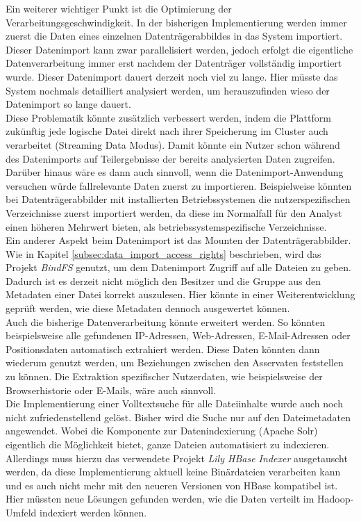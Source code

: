 \noindent
Ein weiterer wichtiger Punkt ist die Optimierung der Verarbeitungsgeschwindigkeit. In der bisherigen Implementierung werden immer zuerst die Daten eines einzelnen Datenträgerabbildes in das System importiert. Dieser Datenimport kann zwar parallelisiert werden, jedoch erfolgt die eigentliche Datenverarbeitung immer erst nachdem der Datenträger vollständig importiert wurde. Dieser Datenimport dauert derzeit noch viel zu lange. Hier müsste das System nochmals detailliert analysiert werden, um herauszufinden wieso der Datenimport so lange dauert. \\
Diese Problematik könnte zusätzlich verbessert werden, indem die Plattform zukünftig jede logische Datei direkt nach ihrer Speicherung im Cluster auch verarbeitet (Streaming Data Modus). Damit könnte ein Nutzer schon während des Datenimports auf Teilergebnisse der bereits analysierten Daten zugreifen. Darüber hinaus wäre es dann auch sinnvoll, wenn die Datenimport-Anwendung versuchen würde fallrelevante Daten zuerst zu importieren. Beispielweise könnten bei Datenträgerabbilder mit installierten Betriebssystemen die nutzerspezifischen Verzeichnisse zuerst importiert werden, da diese im Normalfall für den Analyst einen höheren Mehrwert bieten, als betriebssystemspezifische Verzeichnisse.\\
Ein anderer Aspekt beim Datenimport ist das Mounten der Datenträgerabbilder. Wie in Kapitel \ref{subsec:data_import_access_rights} beschrieben, wird das Projekt \textit{BindFS} genutzt, um dem Datenimport Zugriff auf alle Dateien zu geben. Dadurch ist es derzeit nicht möglich den Besitzer und die Gruppe aus den Metadaten einer Datei korrekt auszulesen. Hier könnte in einer Weiterentwicklung geprüft werden, wie diese Metadaten dennoch ausgewertet können.\\

\noindent
Auch die bisherige Datenverarbeitung könnte erweitert werden. So könnten beispielsweise alle gefundenen IP-Adressen, Web-Adressen, E-Mail-Adressen oder Positionsdaten automatisch extrahiert werden. Diese Daten könnten dann wiederum genutzt werden, um Beziehungen zwischen den Asservaten feststellen zu können.
Die Extraktion spezifischer Nutzerdaten, wie beispielsweise der Browserhistorie oder E-Mails, wäre auch sinnvoll.\\

\noindent
Die Implementierung einer Volltextsuche für alle Dateiinhalte wurde auch noch nicht zufriedenstellend gelöst. Bisher wird die Suche nur auf den Dateimetadaten angewendet. Wobei die Komponente zur Datenindexierung (Apache Solr) eigentlich die Möglichkeit bietet, ganze Dateien automatisiert zu indexieren. Allerdings muss hierzu das verwendete Projekt \textit{Lily HBase Indexer} ausgetauscht werden, da diese Implementierung aktuell keine Binärdateien verarbeiten kann und es auch nicht mehr mit den neueren Versionen von HBase kompatibel ist. Hier müssten neue Lösungen gefunden werden, wie die Daten verteilt im Hadoop-Umfeld indexiert werden können.\\


